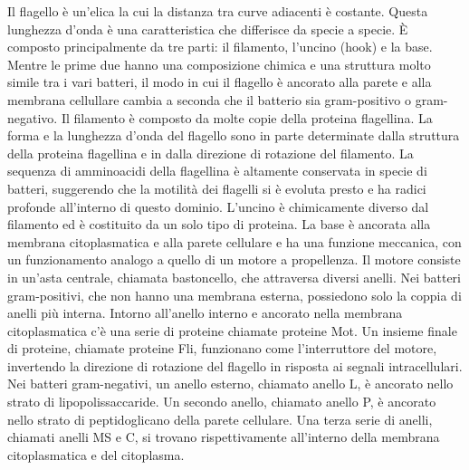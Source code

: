 Il flagello \`e  un’elica la cui la distanza tra curve adiacenti è 
costante. Questa lunghezza d'onda è una caratteristica che differisce da specie a specie. \`E composto principalmente da tre parti: il filamento, l’uncino 
(hook) e la base. Mentre le prime due hanno una composizione chimica e una struttura molto simile tra i vari batteri, il modo in cui il 
flagello è ancorato alla parete e alla membrana cellullare cambia a seconda che il batterio sia gram-positivo o gram-negativo. Il filamento è composto da 
molte copie della proteina flagellina. La forma e la lunghezza d'onda del flagello sono in parte determinate dalla struttura della proteina flagellina e in 
dalla direzione di rotazione del filamento. La sequenza di amminoacidi della flagellina è altamente conservata in specie di batteri, 
suggerendo che la motilità dei flagelli si è evoluta presto e ha radici profonde all'interno di questo dominio. L’uncino è chimicamente diverso dal 
filamento ed è costituito da un solo tipo di proteina. La base è ancorata alla membrana citoplasmatica e alla parete cellulare e ha una funzione meccanica, con un funzionamento analogo 
a quello di un motore a propellenza. Il motore consiste in un’asta centrale, chiamata bastoncello, che 
attraversa diversi anelli. Nei batteri gram-positivi, che non hanno una membrana esterna, possiedono solo la coppia di anelli più interna.
 Intorno 
all'anello interno e ancorato nella membrana citoplasmatica c'è una serie di proteine chiamate proteine Mot. Un insieme finale di proteine, chiamate 
proteine Fli, funzionano come l'interruttore del motore, invertendo la direzione di rotazione del flagello in risposta ai segnali intracellulari. Nei 
batteri gram-negativi, un anello esterno, chiamato anello L, è ancorato nello strato di lipopolissaccaride. Un secondo anello, chiamato anello P, è ancorato 
nello strato di peptidoglicano della parete cellulare. Una terza serie di anelli, chiamati anelli MS e C, si trovano rispettivamente all'interno della 
membrana citoplasmatica e del citoplasma.
